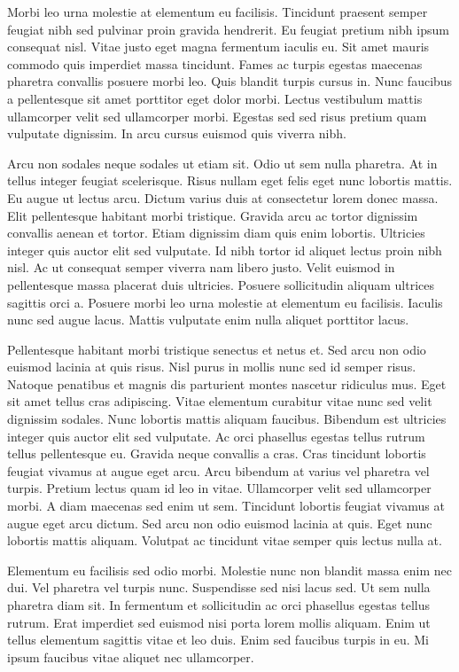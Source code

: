 \documentclass[11pt,a4paper]{article}
\begin{document}
Morbi leo urna molestie at elementum eu facilisis. Tincidunt praesent semper feugiat nibh sed pulvinar proin gravida hendrerit. Eu feugiat pretium nibh ipsum consequat nisl. Vitae justo eget magna fermentum iaculis eu. Sit amet mauris commodo quis imperdiet massa tincidunt. Fames ac turpis egestas maecenas pharetra convallis posuere morbi leo. Quis blandit turpis cursus in. Nunc faucibus a pellentesque sit amet porttitor eget dolor morbi. Lectus vestibulum mattis ullamcorper velit sed ullamcorper morbi. Egestas sed sed risus pretium quam vulputate dignissim. In arcu cursus euismod quis viverra nibh.

Arcu non sodales neque sodales ut etiam sit. Odio ut sem nulla pharetra. At in tellus integer feugiat scelerisque. Risus nullam eget felis eget nunc lobortis mattis. Eu augue ut lectus arcu. Dictum varius duis at consectetur lorem donec massa. Elit pellentesque habitant morbi tristique. Gravida arcu ac tortor dignissim convallis aenean et tortor. Etiam dignissim diam quis enim lobortis. Ultricies integer quis auctor elit sed vulputate. Id nibh tortor id aliquet lectus proin nibh nisl. Ac ut consequat semper viverra nam libero justo. Velit euismod in pellentesque massa placerat duis ultricies. Posuere sollicitudin aliquam ultrices sagittis orci a. Posuere morbi leo urna molestie at elementum eu facilisis. Iaculis nunc sed augue lacus. Mattis vulputate enim nulla aliquet porttitor lacus.

Pellentesque habitant morbi tristique senectus et netus et. Sed arcu non odio euismod lacinia at quis risus. Nisl purus in mollis nunc sed id semper risus. Natoque penatibus et magnis dis parturient montes nascetur ridiculus mus. Eget sit amet tellus cras adipiscing. Vitae elementum curabitur vitae nunc sed velit dignissim sodales. Nunc lobortis mattis aliquam faucibus. Bibendum est ultricies integer quis auctor elit sed vulputate. Ac orci phasellus egestas tellus rutrum tellus pellentesque eu. Gravida neque convallis a cras. Cras tincidunt lobortis feugiat vivamus at augue eget arcu. Arcu bibendum at varius vel pharetra vel turpis. Pretium lectus quam id leo in vitae. Ullamcorper velit sed ullamcorper morbi. A diam maecenas sed enim ut sem. Tincidunt lobortis feugiat vivamus at augue eget arcu dictum. Sed arcu non odio euismod lacinia at quis. Eget nunc lobortis mattis aliquam. Volutpat ac tincidunt vitae semper quis lectus nulla at.

Elementum eu facilisis sed odio morbi. Molestie nunc non blandit massa enim nec dui. Vel pharetra vel turpis nunc. Suspendisse sed nisi lacus sed. Ut sem nulla pharetra diam sit. In fermentum et sollicitudin ac orci phasellus egestas tellus rutrum. Erat imperdiet sed euismod nisi porta lorem mollis aliquam. Enim ut tellus elementum sagittis vitae et leo duis. Enim sed faucibus turpis in eu. Mi ipsum faucibus vitae aliquet nec ullamcorper.
\end{document}

